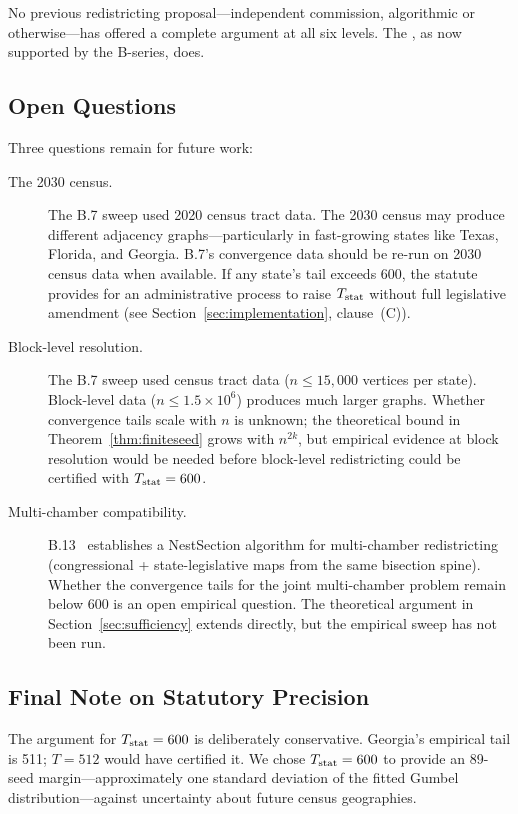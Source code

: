 No previous redistricting proposal---independent commission, algorithmic
or otherwise---has offered a complete argument at all six levels.
The \dia{}, as now supported by the B-series, does.

\subsection{Open Questions}

Three questions remain for future work:

\begin{description}
\item[The 2030 census.]
The B.7 sweep used 2020 census tract data.
The 2030 census may produce different adjacency graphs---particularly in
fast-growing states like Texas, Florida, and Georgia.
B.7's convergence data should be re-run on 2030 census data when available.
If any state's tail exceeds 600, the statute provides for an administrative
process to raise $T_{\mathrm{stat}}$ without full legislative amendment (see
Section~\ref{sec:implementation}, clause~(C)).

\item[Block-level resolution.]
The B.7 sweep used census tract data ($n \le 15{,}000$ vertices per state).
Block-level data ($n \le 1.5 \times 10^6$) produces much larger graphs.
Whether \cs{} convergence tails scale with $n$ is unknown; the theoretical
bound in Theorem~\ref{thm:finiteseed} grows with $n^{2k}$, but empirical
evidence at block resolution would be needed before block-level redistricting
could be certified with $T_{\mathrm{stat}} = 600$.

\item[Multi-chamber compatibility.]
B.13~\citep{b13paper} establishes a NestSection algorithm for multi-chamber
redistricting (congressional + state-legislative maps from the same bisection
spine).
Whether the \cs{} convergence tails for the joint multi-chamber problem
remain below 600 is an open empirical question.
The theoretical argument in Section~\ref{sec:sufficiency} extends directly,
but the empirical sweep has not been run.
\end{description}

\subsection{Final Note on Statutory Precision}

The argument for $T_{\mathrm{stat}} = 600$ is deliberately conservative.
Georgia's empirical tail is 511; $T = 512$ would have certified it.
We chose $T_{\mathrm{stat}} = 600$ to provide an 89-seed margin---approximately one
standard deviation of the fitted Gumbel distribution---against uncertainty
about future census geographies.

